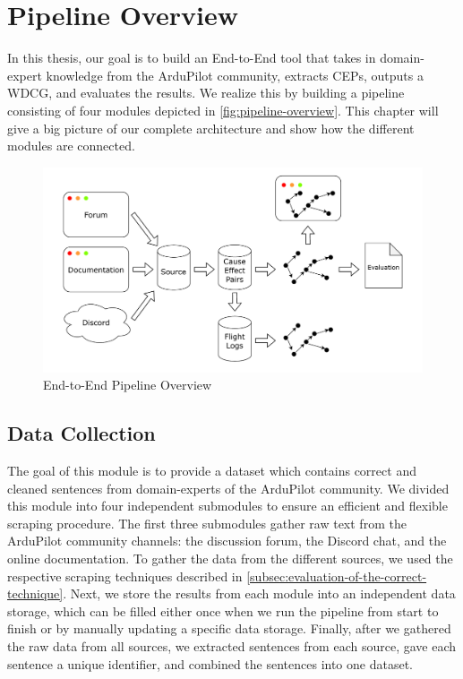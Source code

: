 \chapter{Pipeline Overview}\label{ch:pipeline-overview}
In this thesis, our goal is to build an End-to-End tool that takes in domain-expert knowledge from the ArduPilot community, extracts \ac{CEP}s, outputs a \ac{WDCG}, and evaluates the results.
We realize this by building a pipeline consisting of four modules depicted in \autoref{fig:pipeline-overview}.
This chapter will give a big picture of our complete architecture and show how the different modules are connected.

\begin{figure}
    \includegraphics[width=\textwidth]{figures/pipeline_overview/pipeline_overview}
    \caption{End-to-End Pipeline Overview}\label{fig:pipeline-overview}
\end{figure}


\section{Data Collection}\label{sec:data-collection-pipeline}
The goal of this module is to provide a dataset which contains correct and cleaned sentences from domain-experts of the ArduPilot community.
We divided this module into four independent submodules to ensure an efficient and flexible scraping procedure.
The first three submodules gather raw text from the ArduPilot community channels: the discussion forum, the Discord chat, and the online documentation.
To gather the data from the different sources, we used the respective scraping techniques described in \autoref{subsec:evaluation-of-the-correct-technique}.
Next, we store the results from each module into an independent data storage, which can be filled either once when we run the pipeline from start to finish or by manually updating a specific data storage.
Finally, after we gathered the raw data from all sources, we extracted sentences from each source, gave each sentence a unique identifier, and combined the sentences into one dataset.


